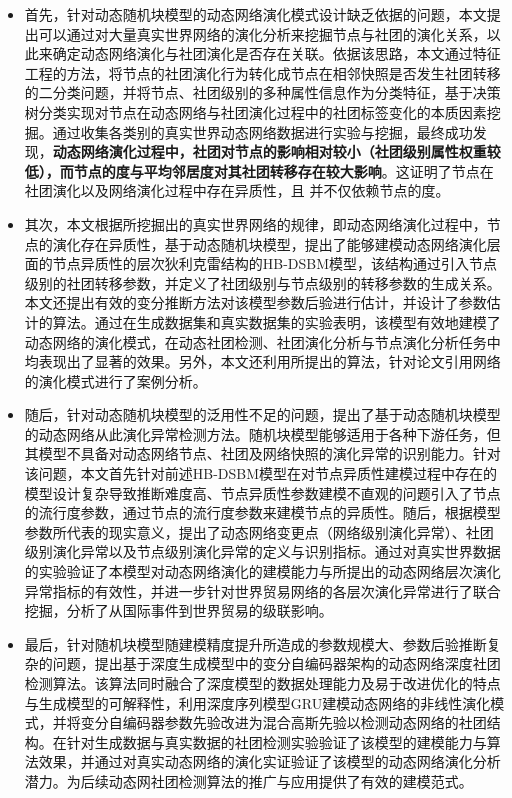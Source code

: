 \begin{itemize}
	\item 首先，针对动态随机块模型的动态网络演化模式设计缺乏依据的问题，本文提出可以通过对大量真实世界网络的演化分析来挖掘节点与社团的演化关系，以此来确定动态网络演化与社团演化是否存在关联。依据该思路，本文通过特征工程的方法，将节点的社团演化行为转化成节点在相邻快照是否发生社团转移的二分类问题，并将节点、社团级别的多种属性信息作为分类特征，基于决策树分类实现对节点在动态网络与社团演化过程中的社团标签变化的本质因素挖掘。通过收集各类别的真实世界动态网络数据进行实验与挖掘，最终成功发现，\textbf{动态网络演化过程中，社团对节点的影响相对较小（社团级别属性权重较低），而节点的度与平均邻居度对其社团转移存在较大影响}。这证明了节点在社团演化以及网络演化过程中存在异质性，且 并不仅依赖节点的度。
	

	
	\item 其次，本文根据所挖掘出的真实世界网络的规律，即动态网络演化过程中，节点的演化存在异质性，基于动态随机块模型，提出了能够建模动态网络演化层面的节点异质性的层次狄利克雷结构的HB-DSBM模型，该结构通过引入节点级别的社团转移参数，并定义了社团级别与节点级别的转移参数的生成关系。本文还提出有效的变分推断方法对该模型参数后验进行估计，并设计了参数估计的算法。通过在生成数据集和真实数据集的实验表明，该模型有效地建模了动态网络的演化模式，在动态社团检测、社团演化分析与节点演化分析任务中均表现出了显著的效果。另外，本文还利用所提出的算法，针对论文引用网络的演化模式进行了案例分析。
	
	\item 随后，针对动态随机块模型的泛用性不足的问题，提出了基于动态随机块模型的动态网络从此演化异常检测方法。随机块模型能够适用于各种下游任务，但其模型不具备对动态网络节点、社团及网络快照的演化异常的识别能力。针对该问题，本文首先针对前述HB-DSBM模型在对节点异质性建模过程中存在的模型设计复杂导致推断难度高、节点异质性参数建模不直观的问题引入了节点的流行度参数，通过节点的流行度参数来建模节点的异质性。随后，根据模型参数所代表的现实意义，提出了动态网络变更点（网络级别演化异常）、社团级别演化异常以及节点级别演化异常的定义与识别指标。通过对真实世界数据的实验验证了本模型对动态网络演化的建模能力与所提出的动态网络层次演化异常指标的有效性，并进一步针对世界贸易网络的各层次演化异常进行了联合挖掘，分析了从国际事件到世界贸易的级联影响。
	
	
	\item 最后，针对随机块模型随建模精度提升所造成的参数规模大、参数后验推断复杂的问题，提出基于深度生成模型中的变分自编码器架构的动态网络深度社团检测算法。该算法同时融合了深度模型的数据处理能力及易于改进优化的特点与生成模型的可解释性，利用深度序列模型GRU建模动态网络的非线性演化模式，并将变分自编码器参数先验改进为混合高斯先验以检测动态网络的社团结构。在针对生成数据与真实数据的社团检测实验验证了该模型的建模能力与算法效果，并通过对真实动态网络的演化实证验证了该模型的动态网络演化分析潜力。为后续动态网社团检测算法的推广与应用提供了有效的建模范式。
\end{itemize}




